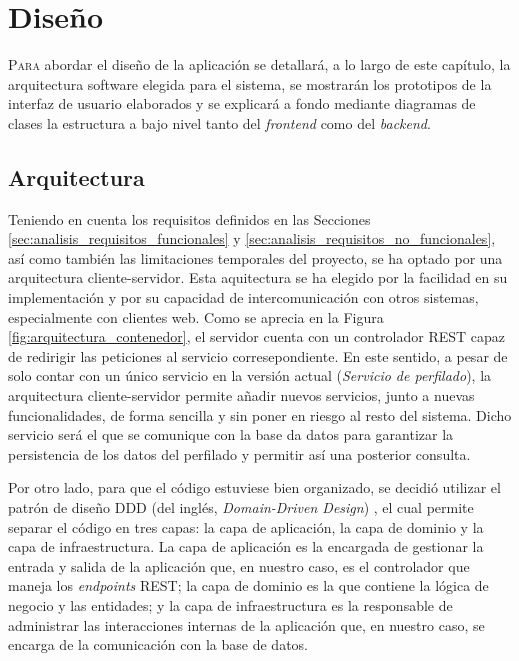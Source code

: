 \chapter{Diseño}
\label{chap:diseño}

\lettrine{P}{ara} abordar el diseño de la aplicación se detallará, a lo largo de este capítulo, la arquitectura software elegida para el sistema,
se mostrarán los prototipos de la interfaz de usuario elaborados y se explicará a fondo mediante diagramas de clases la estructura a bajo nivel
tanto del \textit{frontend} como del \textit{backend}.

\section{Arquitectura}
\label{sec:diseño_arquitectura}

Teniendo en cuenta los requisitos definidos en las Secciones \ref{sec:analisis_requisitos_funcionales} y \ref{sec:analisis_requisitos_no_funcionales},
así como también las limitaciones temporales del proyecto, se ha optado por una arquitectura cliente-servidor. Esta aquitectura se ha elegido
por la facilidad en su implementación y por su capacidad de intercomunicación con otros sistemas, especialmente con clientes web. Como
se aprecia en la Figura \ref{fig:arquitectura_contenedor}, el servidor cuenta con un controlador REST capaz de redirigir las peticiones al servicio
corresepondiente. En este sentido, a pesar de solo contar con un único servicio en la versión actual (\textit{Servicio de perfilado}),
la arquitectura cliente-servidor permite añadir nuevos servicios, junto a nuevas funcionalidades, de forma sencilla y sin poner en riesgo al resto del sistema.
Dicho servicio será el que se comunique con la base da datos para garantizar la persistencia de los datos del perfilado y permitir así
una posterior consulta.

\bigskip
Por otro lado, para que el código estuviese bien organizado, se decidió utilizar el patrón de diseño DDD (del inglés, \textit{Domain-Driven Design}) \cite{ddd}, el cual
permite separar el código en tres capas: la capa de aplicación, la capa de dominio y la capa de infraestructura. La capa de aplicación es la encargada de gestionar
la entrada y salida de la aplicación que, en nuestro caso, es el controlador que maneja los \textit{endpoints} REST; la capa de dominio es la que contiene la lógica
de negocio y las entidades; y la capa de infraestructura es la responsable de administrar las interacciones internas de la aplicación que, en nuestro
caso, se encarga de la comunicación con la base de datos.

